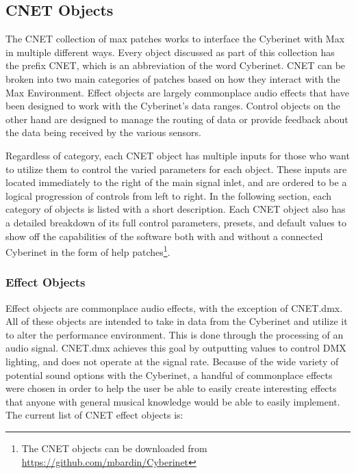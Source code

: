 \subsection{CNET Objects}
The CNET collection of max patches works to interface the Cyberinet with Max in multiple different ways. Every object discussed as part of this collection has the prefix CNET, which is an abbreviation of the word Cyberinet. CNET can be broken into two main categories of patches based on how they interact with the Max Environment. Effect objects are largely commonplace audio effects that have been designed to work with the Cyberinet's data ranges. Control objects on the other hand are designed to manage the routing of data or provide feedback about the data being received by the various sensors.

Regardless of category, each CNET object has multiple inputs for those who want to utilize them to control the varied parameters for each object. These inputs are located immediately to the right of the main signal inlet, and are ordered to be a logical progression of controls from left to right. In the following section, each category of objects is listed with a short description. Each CNET object also has a detailed breakdown of its full control parameters, presets, and default values to show off the capabilities of the software both with and without a connected Cyberinet in the form of help patches\footnote{The CNET objects can be downloaded from \url{https://github.com/mbardin/Cyberinet}}.

\subsubsection{Effect Objects}

Effect objects are commonplace audio effects, with the exception of CNET.dmx. All of these objects are intended to take in data from the Cyberinet and utilize it to alter the performance environment. This is done through the processing of an audio signal. CNET.dmx achieves this goal by outputting values to control DMX lighting, and does not operate at the signal rate. Because of the wide variety of potential sound options with the Cyberinet, a handful of commonplace effects were chosen in order to help the user be able to easily create interesting effects that anyone with general musical knowledge would be able to easily implement. The current list of CNET effect objects is:

